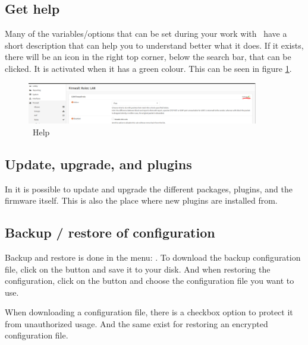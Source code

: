 \subsection{Get help} \label{get_help}
Many of the variables/options that can be set during your work with \opnsense\ have a short description that can help you to understand better what it does. If it exists, there will be an icon in the right top corner, below the search bar, that can be clicked. It is activated when it has a green colour. This can be seen in figure \ref{opensense:get_help}.

\begin{figure}[h!]
    \centering
    \includegraphics[width=0.9\textwidth]{Images/firewall/help.PNG}
    \caption{\opnsense\ Help}
    \label{opensense:get_help}
\end{figure}

\subsection{Update, upgrade, and plugins}
In  it is possible to update and upgrade the different packages, plugins, and the firmware itself. This is also the place where new plugins are installed from.

\subsection{Backup / restore of configuration}
Backup and restore is done in the menu: . To download the backup configuration file, click on the  button and save it to your disk. And when restoring the configuration, click on the  button and choose the configuration file you want to use.

When downloading a configuration file, there is a checkbox option to protect it from unauthorized usage. And the same exist for restoring an encrypted configuration file.


